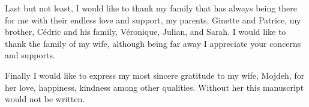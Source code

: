 \begin{acknowledgements}
Last but not least, I would like to thank my family that has always being there for me with their endless love and support, my parents, Ginette and Patrice, my brother, C\'edric and his family, V\'eronique, Julian, and Sarah.
I would like to thank the family of my wife, although being far away I appreciate your concerns and supports. 

Finally I would like to express my most sincere gratitude to my wife, Mojdeh, for her love, happiness, kindness among other qualities.
Without her this manuscript would not be written.
   

\end{acknowledgements}



